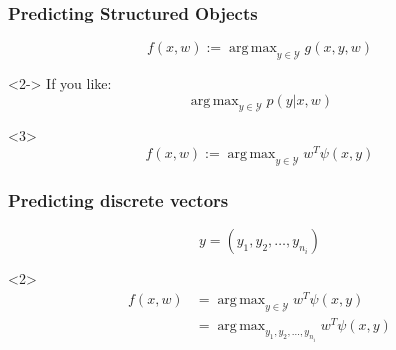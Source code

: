 \documentclass[final,ignorenonframetext,compress]{beamer}
\DeclareMathOperator*{\argmax}{arg\,max}
\begin{document}

\begin{frame}
    \frametitle{Predicting Structured Objects}
    \[f(x, w) := \argmax_{y \in \mathcal{Y}}  g(x, y, w) \]
    \begin{visibleenv}<2->
    If you like:
    \[\argmax_{y \in \mathcal{Y}}  p(y|x, w) \]
    \end{visibleenv}
    
    \begin{visibleenv}<3>
    \[f(x, w) := \argmax_{y \in \mathcal{Y}}  w^T \psi(x, y) \]
    \end{visibleenv}
\end{frame}

\begin{frame}
    \frametitle{Predicting discrete vectors}
    \[y = (y_1, y_2, \dotsc, y_{n_i})\]
    \begin{visibleenv}<2>
        \begin{align*}
        f(x, w) &= \argmax_{y \in \mathcal{Y}}  w^T \psi(x, y)\\
            &= \argmax_{y_1, y_2, \dotsc, y_{n_i}} w^T \psi(x, y)
        \end{align*}
    \end{visibleenv}
\end{frame}
\end{document}
